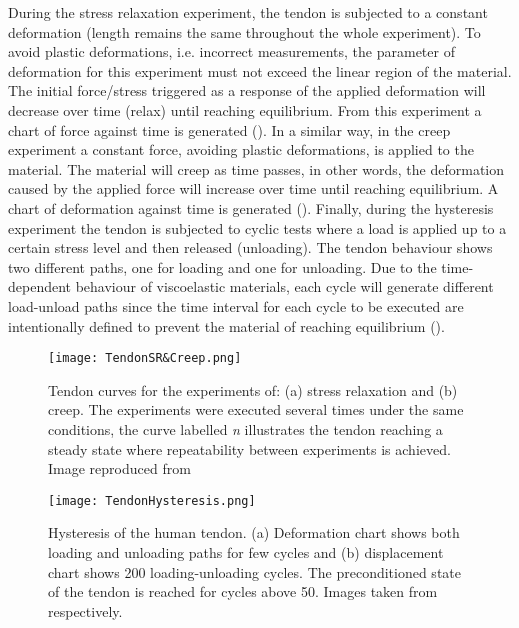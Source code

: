 During the stress relaxation experiment, the tendon is subjected to a constant deformation (length remains the same throughout the whole experiment). To avoid plastic deformations, i.e. incorrect measurements, the parameter of deformation for this experiment must not exceed the linear region of the material. The initial force/stress triggered as a response of the applied deformation will decrease over time (relax) until reaching equilibrium. From this experiment a chart of force against time is generated (). In a similar way, in the creep experiment a constant force, avoiding plastic deformations, is applied to the material. The material will creep as time passes, in other words, the deformation caused by the applied force will increase over time until reaching equilibrium. A chart of deformation against time is generated (). Finally, during the hysteresis experiment the tendon is subjected to cyclic tests where a load is applied up to a certain stress level and then released (unloading). The tendon behaviour shows two different paths, one for loading and one for unloading. Due to the time-dependent behaviour of viscoelastic materials, each cycle will generate different load-unload paths since the time interval for each cycle to be executed are intentionally defined to prevent the material of reaching equilibrium ().

\begin{figure}[htb!]
    \centering
    \texttt{[image: TendonSR\&Creep.png]}
    \caption{Tendon curves for the experiments of: (a) stress relaxation and (b) creep. The experiments were executed several times under the same conditions, the curve labelled \textit{n} illustrates the tendon reaching a steady state where repeatability between experiments is achieved. Image reproduced from \cite{maurel1998biomechanical} }
    \label{fig:tendonSR_Creep}
\end{figure}

\begin{figure}[htb!]
    \centering
    \texttt{[image: TendonHysteresis.png]}
    \caption{Hysteresis of the human tendon. (a) Deformation chart shows both loading and unloading paths for few cycles and (b) displacement chart shows 200 loading-unloading cycles. The preconditioned state of the tendon is reached for cycles above 50. Images taken from \cite{maurel1998biomechanical,schatzmann1998effect} respectively. }
    \label{fig:tendonHysteresis}
\end{figure}

